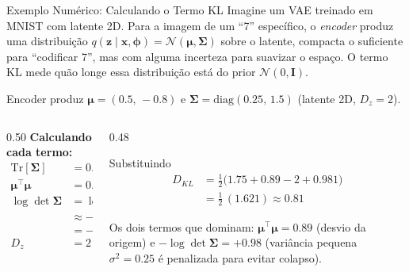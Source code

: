 \documentclass[aspectratio=169,xcolor=dvipsnames]{beamer}
\begin{document}
  \begin{frame}{Exemplo Numérico: Calculando o Termo KL}
    \footnotesize Imagine um VAE treinado em MNIST com latente 2D.
    Para a imagem de um ``7'' específico, o \emph{encoder} produz uma
    distribuição $q(\mathbf{z}\mid \mathbf{x}, \bm{\phi}) = \mathcal{N}(\boldsymbol{\mu}, \boldsymbol{\Sigma})$ sobre o
    latente, compacta o suficiente para ``codificar 7'', mas com alguma
    incerteza para suavizar o espaço. O termo KL mede quão longe essa
    distribuição está do prior $\mathcal{N}(0, \mathbf{I})$.

    \normalsize
    Encoder produz $\boldsymbol{\mu} = (0.5,\, -0.8)$ e
    $\boldsymbol{\Sigma} = \mathrm{diag}(0.25,\, 1.5)$ (latente 2D, $D_z = 2$).
    \begin{columns}[T]
      \begin{column}{0.50\textwidth}
        \textbf{Calculando cada termo:}
        \begin{align*}
          \mathrm{Tr}[\boldsymbol{\Sigma}] &= 0.25 + 1.5 = 1.75 \\
          \boldsymbol{\mu}^{\top}\boldsymbol{\mu} &= 0.25 + 0.64 = 0.89 \\
          \log\det\boldsymbol{\Sigma} &= \log(0.25) + \log(1.5) \\
                          &\approx -1.386 + 0.405 \\
                          &= -0.981 \\
          D_z &= 2
        \end{align*}
      \end{column}
      \begin{column}{0.48\textwidth}
        \begin{block}{Substituindo}
          \begin{align*}
            D_{KL} &= \tfrac{1}{2}\bigl(1.75 + 0.89 - 2 + 0.981\bigr) \\
                   &= \tfrac{1}{2}\,(1.621) \approx \mathbf{0.81}
          \end{align*}
        \end{block}
        Os dois termos que dominam:
        $\boldsymbol{\mu}^{\top}\boldsymbol{\mu} = 0.89$ (desvio da origem) e
        $-\log\det\boldsymbol{\Sigma} = +0.98$ (variância pequena $\sigma^{2}=0.25$
        é penalizada para evitar colapso).
      \end{column}
    \end{columns}
  \end{frame}
\end{document}
